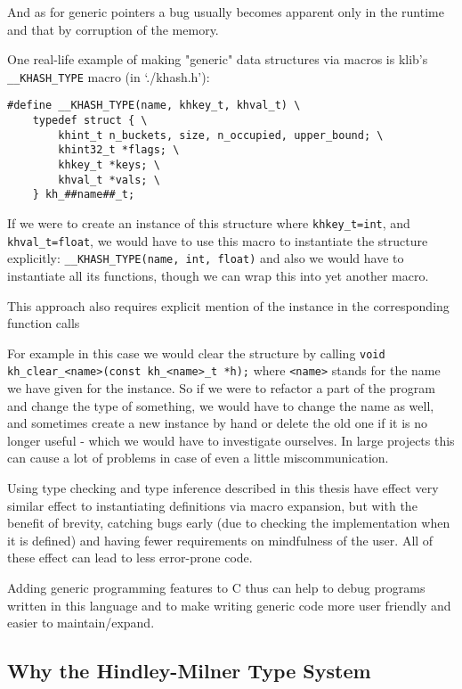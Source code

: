 And as for generic pointers a bug usually becomes apparent only in the runtime and that by corruption of the memory.

One real-life example of making "generic" data structures via macros is klib's \lstinline{__KHASH_TYPE} macro (in `./khash.h'): %

\begin{lstlisting}
#define __KHASH_TYPE(name, khkey_t, khval_t) \
	typedef struct { \
		khint_t n_buckets, size, n_occupied, upper_bound; \
		khint32_t *flags; \
		khkey_t *keys; \
		khval_t *vals; \
	} kh_##name##_t;
\end{lstlisting}

If we were to create an instance of this structure where \lstinline{khkey_t=int}, and \lstinline{khval_t=float}, we would have to use this macro to instantiate the structure explicitly: \lstinline{__KHASH_TYPE(name, int, float)} and also we would have to instantiate all its functions, though we can wrap this into yet another macro.

This approach also requires explicit mention of the instance in the corresponding function calls

For example in this case we would clear the structure by calling
\lstinline{void kh_clear_<name>(const kh_<name>_t *h);} where \lstinline{<name>} stands for the name we have given for the instance. So if we were to refactor a part of the program and change the type of something, we would have to change the name as well, and sometimes create a new instance by hand or delete the old one if it is no longer useful - which we would have to investigate ourselves. In large projects this can cause a lot of problems in case of even a little miscommunication.

Using type checking and type inference described in this thesis have effect very similar effect to instantiating definitions via macro expansion, but with the benefit of brevity, catching bugs early (due to checking the implementation when it is defined) and having fewer requirements on mindfulness of the user. All of these effect can lead to less error-prone code.

Adding generic programming features to C thus can help to debug programs written in this language and to make writing generic code more user friendly and easier to maintain/expand. %

\subsection{Why the Hindley-Milner Type System}


